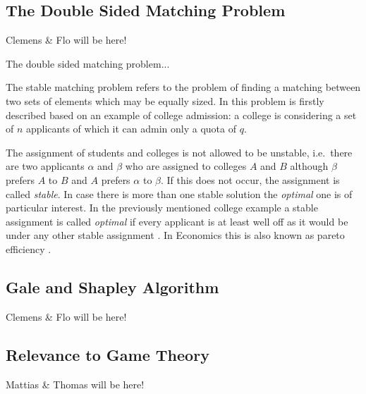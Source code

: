 \subsection{The Double Sided Matching Problem}
Clemens & Flo will be here!

The double sided matching problem...

The stable matching problem refers to the problem of finding a matching between two sets of elements which may be equally sized. In \cite[p. 9]{gale62a} this problem is firstly described based on an example of college admission: a college is considering a set of $n$ applicants of which it can admin only a quota of $q$.

The assignment of students and colleges is not allowed to be unstable, i.e.\ there are two applicants $\alpha$ and $\beta$ who are assigned to colleges $A$ and $B$ although $\beta$ prefers $A$ to $B$ and $A$ prefers $\alpha$ to $\beta$. If this does not occur, the assignment is called \textit{stable}. In case there is more than one stable solution the \textit{optimal} one is of particular interest. In the previously mentioned college example a stable assignment is called \textit{optimal} if every applicant is at least well off as it would be under any other stable assignment \cite[p. 10]{gale62a}. In Economics this is also known as pareto efficiency \cite[p. 46]{9780199297818}.

\subsection{Gale and Shapley Algorithm}
Clemens & Flo will be here!

\subsection{Relevance to Game Theory}
Mattias & Thomas will be here!